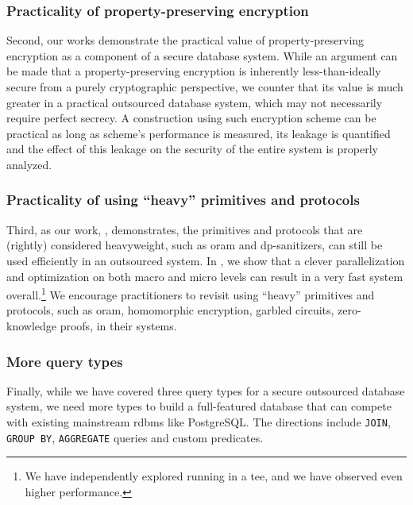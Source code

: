 	\subsubsection{Practicality of property-preserving encryption}

		Second, our works \cite{ore-benchmark-17,k-anon} demonstrate the practical value of property-preserving encryption as a component of a secure database system.
		While an argument can be made that a property-preserving encryption is inherently less-than-ideally secure from a purely cryptographic perspective, we counter that its value is much greater in a practical outsourced database system, which may not necessarily require perfect secrecy.
		A construction using such encryption scheme can be practical as long as scheme's performance is measured, its leakage is quantified and the effect of this leakage on the security of the entire system is properly analyzed.

	\subsubsection{Practicality of using ``heavy'' primitives and protocols}

		Third, as our work, \epsolute{}, demonstrates, the primitives and protocols that are (rightly) considered heavyweight, such as \acrshort{oram} and \acrshort{dp}-sanitizers, can still be used efficiently in an outsourced system.
		In \epsolute{}, we show that a clever parallelization and optimization on both macro and micro levels can result in a very fast system overall.\footnote{
			We have independently explored running \epsolute{} in a \acrlong{tee}, and we have observed even higher performance.
		}
		We encourage practitioners to revisit using ``heavy'' primitives and protocols, such as \acrshort{oram}, homomorphic encryption, garbled circuits, zero-knowledge proofs, in their systems.

	\subsubsection{More query types}

		Finally, while we have covered three query types for a secure outsourced database system, we need more types to build a full-featured database that can compete with existing mainstream \acrshort{rdbms} like PostgreSQL\@.
		The directions include \texttt{JOIN}, \texttt{GROUP BY}, \texttt{AGGREGATE} queries and custom predicates.
